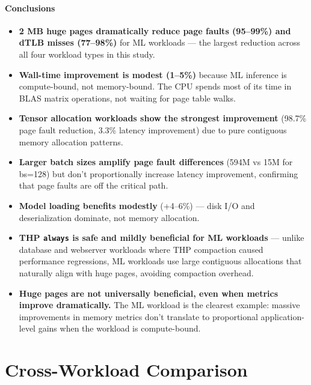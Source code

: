 \documentclass[conference]{IEEEtran}
\begin{document}
\paragraph{Conclusions}
\begin{itemize}
\item \textbf{2 MB huge pages dramatically reduce page faults (95--99\%) and dTLB misses (77--98\%)} for ML workloads --- the largest reduction across all four workload types in this study.

\item \textbf{Wall-time improvement is modest (1--5\%)} because ML inference is compute-bound, not memory-bound. The CPU spends most of its time in BLAS matrix operations, not waiting for page table walks.

\item \textbf{Tensor allocation workloads show the strongest improvement} (98.7\% page fault reduction, 3.3\% latency improvement) due to pure contiguous memory allocation patterns.

\item \textbf{Larger batch sizes amplify page fault differences} (594M vs 15M for bs=128) but don't proportionally increase latency improvement, confirming that page faults are off the critical path.

\item \textbf{Model loading benefits modestly} (+4--6\%) --- disk I/O and deserialization dominate, not memory allocation.

\item \textbf{THP \texttt{always} is safe and mildly beneficial for ML workloads} --- unlike database and webserver workloads where THP compaction caused performance regressions, ML workloads use large contiguous allocations that naturally align with huge pages, avoiding compaction overhead.

\item \textbf{Huge pages are not universally beneficial, even when metrics improve dramatically.} The ML workload is the clearest example: massive improvements in memory metrics don't translate to proportional application-level gains when the workload is compute-bound.
\end{itemize}

\section{Cross-Workload Comparison}
\end{document}
